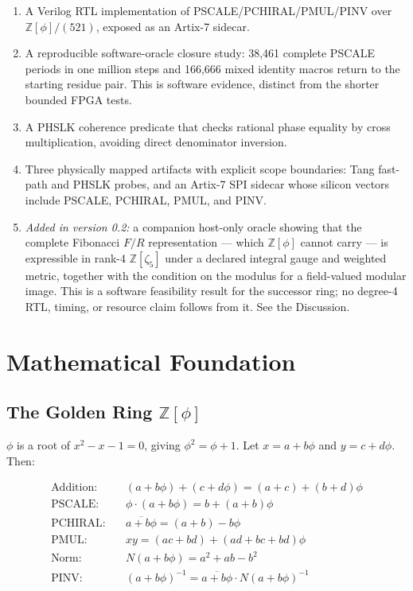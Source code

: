\documentclass[conference]{IEEEtran}
\begin{document}
\begin{enumerate}
    \item A Verilog RTL implementation of PSCALE/PCHIRAL/PMUL/PINV over $\mathbb{Z}[\phi]/(521)$, exposed as an Artix-7 sidecar.
    \item A reproducible software-oracle closure study: 38,461 complete
    PSCALE periods in one million steps and 166,666 mixed identity macros
    return to the starting residue pair. This is software evidence, distinct
    from the shorter bounded FPGA tests.
    \item A PHSLK coherence predicate that checks rational phase equality by cross multiplication, avoiding direct denominator inversion.
    \item Three physically mapped artifacts with explicit scope boundaries:
    Tang fast-path and PHSLK probes, and an Artix-7 SPI sidecar whose silicon
    vectors include PSCALE, PCHIRAL, PMUL, and PINV.
    \item \emph{Added in version 0.2:} a companion host-only oracle showing that
    the complete Fibonacci $F/R$ representation --- which $\mathbb{Z}[\phi]$
    cannot carry --- is expressible in rank-4 $\mathbb{Z}[\zeta_5]$ under a
    declared integral gauge and weighted metric, together with the condition on
    the modulus for a field-valued modular image. This is a software
    feasibility result for the successor ring; no degree-4 RTL, timing, or
    resource claim follows from it. See the Discussion.
\end{enumerate}

\section{Mathematical Foundation}

\subsection{The Golden Ring \texorpdfstring{$\mathbb{Z}[\phi]$}{Z[phi]}}

$\phi$ is a root of $x^2 - x - 1 = 0$, giving $\phi^2 = \phi + 1$. Let
$x=a+b\phi$ and $y=c+d\phi$. Then:

\begin{align*}
\text{Addition:}&\quad (a+b\phi) + (c+d\phi) = (a+c) + (b+d)\phi \\
\text{PSCALE:}&\quad \phi\cdot(a+b\phi) = b + (a+b)\phi \\
\text{PCHIRAL:}&\quad \overline{a+b\phi} = (a+b) - b\phi \\
\text{PMUL:}&\quad xy = (ac+bd) + (ad+bc+bd)\phi \\
\text{Norm:}&\quad N(a+b\phi) = a^2 + ab - b^2 \\
\text{PINV:}&\quad (a+b\phi)^{-1} = \overline{a+b\phi} \cdot N(a+b\phi)^{-1}
\end{align*}
\end{document}
